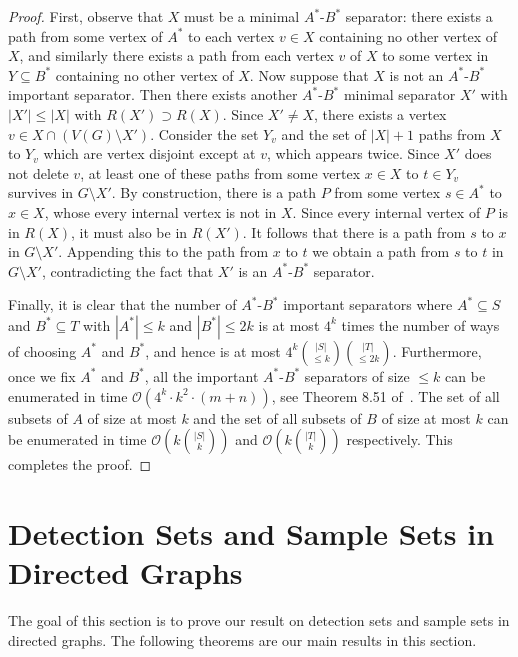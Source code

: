 \documentclass[11pt]{article}
\newcommand{\OO}{\mathcal{O}}
\begin{document}
\begin{proof}
First, observe that $X$ must be a minimal $A^*$-$B^*$ separator: there exists a path from some vertex of $A^*$ to each vertex $v \in X$ containing no other vertex of $X$, and similarly there exists a path from each vertex $v$ of $X$ to some vertex in $Y \subseteq B^*$ containing no other vertex of $X$. Now suppose that $X$ is not an $A^*$-$B^*$ important separator. Then there exists another $A^*$-$B^*$ minimal separator $X'$ with $|X'| \leq |X|$ with $R(X') \supset R(X)$. Since $X' \neq X$, there exists a vertex $v \in X \cap (V(G) \setminus X')$. Consider the set $Y_v$ and the set of $|X| + 1$ paths from $X$ to $Y_v$ which are vertex disjoint except at $v$, which appears twice. Since $X'$ does not delete $v$, at least one of these paths from some vertex $x \in X$ to $t \in Y_v$ survives in $G \setminus X'$. By construction, there is a path $P$ from some vertex $s \in A^*$ to $x \in X$, whose every internal vertex is not in $X$. Since every internal vertex of $P$ is in $R(X)$, it must also be in $R(X')$. It follows that there is a path from $s$ to $x$ in $G \setminus X'$. Appending this to the path from $x$ to $t$ we obtain a path from $s$ to $t$ in $G \setminus X'$, contradicting the fact that $X'$ is an $A^*$-$B^*$ separator.

Finally, it is clear that the number of $A^*$-$B^*$ important separators where $A^* \subseteq S$ and $B^* \subseteq T$ with $|A^*| \leq k$ and $|B^*| \leq 2k$ is at most $4^k$ times the number of 
ways of choosing $A^*$ and $B^*$,
and hence is at most $4^k {|S| \choose \leq k}{|T| \choose \leq 2k}$.
Furthermore, once we fix $A^*$ and $B^*$, all the important $A^*$-$B^*$ separators of size $\leq k$ can be enumerated in time $\mathcal{O}(4^k \cdot k^2 \cdot (m+n))$, see Theorem 8.51 of~\cite{cygan2015parameterized}. The set of all subsets of $A$ of size at most $k$ and the set of all subsets of $B$ of size at most $k$ can be enumerated in time $\OO(k {|S| \choose k})$ and $\OO(k {|T| \choose k})$ respectively. This completes the proof.
\end{proof}




















\section{Detection Sets and Sample Sets in Directed Graphs}
The goal of this section is to prove our result on detection sets and sample sets in directed graphs. The following theorems are our main results in this section.
\detectionset*
\sampleset*
\end{document}
